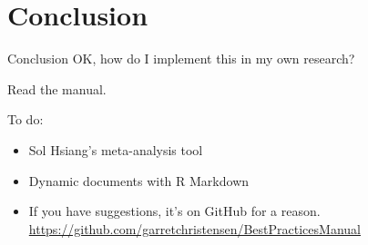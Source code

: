 \documentclass{beamer}
\begin{document}
\section{Conclusion}
\begin{frame}{Conclusion}
OK, how do I implement this in my own research?

Read the manual.

\vspace{0.25in}
To do:
\begin{itemize}[<.->]
\item Sol Hsiang's meta-analysis tool
\item Dynamic documents with R Markdown
\item If you have suggestions, it's on GitHub for a reason.
\url{https://github.com/garretchristensen/BestPracticesManual}
\href{https://github.com/garretchristensen/BestPracticesManual}{}
\end{itemize}
\end{frame}
\end{document}
